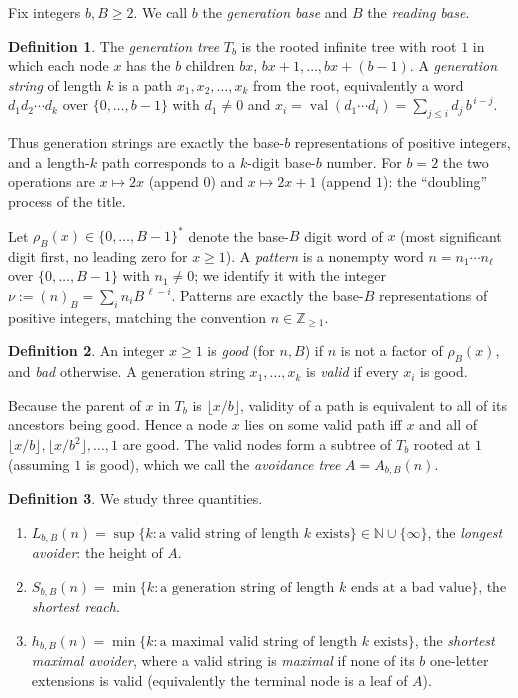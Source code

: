 \documentclass[11pt]{article}
\theoremstyle{plain}
\theoremstyle{definition}
\newtheorem{definition}{Definition}
\theoremstyle{remark}
\DeclareMathOperator{\val}{val}
\newcommand{\base}[2]{(#1)_{#2}}
\newcommand{\NN}{\mathbb{N}}
\newcommand{\ZZ}{\mathbb{Z}}
\newcommand{\Lbb}{L_{b,B}}
\newcommand{\Sbb}{S_{b,B}}
\newcommand{\hbb}{h_{b,B}}
\begin{document}
Fix integers $b,B\ge 2$. We call $b$ the \emph{generation base} and $B$ the \emph{reading base}.

\begin{definition}
The \emph{generation tree} $T_b$ is the rooted infinite tree with root $1$ in which each node $x$ has the $b$ children $bx,\,bx+1,\dots,bx+(b-1)$. A \emph{generation string} of length $k$ is a path $x_1,x_2,\dots,x_k$ from the root, equivalently a word $d_1d_2\cdots d_k$ over $\{0,\dots,b-1\}$ with $d_1\neq 0$ and $x_i=\val(d_1\cdots d_i)=\sum_{j\le i} d_j\,b^{\,i-j}$.
\end{definition}

Thus generation strings are exactly the base-$b$ representations of positive integers, and a length-$k$ path corresponds to a $k$-digit base-$b$ number. For $b=2$ the two operations are $x\mapsto 2x$ (append $0$) and $x\mapsto 2x+1$ (append $1$): the ``doubling'' process of the title.

Let $\rho_B(x)\in\{0,\dots,B-1\}^{*}$ denote the base-$B$ digit word of $x$ (most significant digit first, no leading zero for $x\ge 1$). A \emph{pattern} is a nonempty word $n=n_1\cdots n_\ell$ over $\{0,\dots,B-1\}$ with $n_1\neq 0$; we identify it with the integer $\nu:=\base{n}{B}=\sum_{i}n_i B^{\,\ell-i}$. Patterns are exactly the base-$B$ representations of positive integers, matching the convention $n\in\ZZ_{\ge1}$.

\begin{definition}
An integer $x\ge 1$ is \emph{good} (for $n,B$) if $n$ is not a factor of $\rho_B(x)$, and \emph{bad} otherwise. A generation string $x_1,\dots,x_k$ is \emph{valid} if every $x_i$ is good.
\end{definition}

Because the parent of $x$ in $T_b$ is $\lfloor x/b\rfloor$, validity of a path is equivalent to all of its ancestors being good. Hence a node $x$ lies on some valid path iff $x$ and all of $\lfloor x/b\rfloor,\lfloor x/b^2\rfloor,\dots,1$ are good. The valid nodes form a subtree of $T_b$ rooted at $1$ (assuming $1$ is good), which we call the \emph{avoidance tree} $A=A_{b,B}(n)$.

\begin{definition}
We study three quantities.
\begin{enumerate}[label=\textup{(\roman*)},leftmargin=2.2em]
\item $\Lbb(n)=\sup\{k:\text{a valid string of length }k\text{ exists}\}\in\NN\cup\{\infty\}$, the \emph{longest avoider}: the height of $A$.
\item $\Sbb(n)=\min\{k:\text{a generation string of length }k\text{ ends at a bad value}\}$, the \emph{shortest reach}.
\item $\hbb(n)=\min\{k:\text{a maximal valid string of length }k\text{ exists}\}$, the \emph{shortest maximal avoider}, where a valid string is \emph{maximal} if none of its $b$ one-letter extensions is valid (equivalently the terminal node is a leaf of $A$).
\end{enumerate}
\end{definition}
\end{document}

